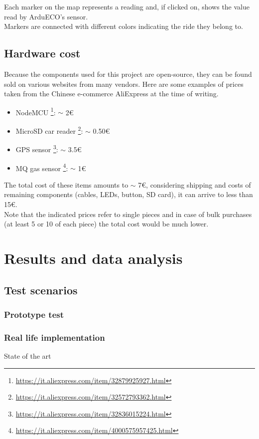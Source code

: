 \documentclass[conference]{IEEEtran}
\begin{document}
		Each marker on the map represents a reading and, if clicked on, shows the value read by ArduECO's sensor.\\
		Markers are connected with different colors indicating the ride they belong to.
		
	\subsection{Hardware cost}
	
		Because the components used for this project are open-source, they can be found sold on various websites from many vendors.
		Here are some examples of prices taken from the Chinese e-commerce AliExpress\cite{aliexpress} at the time of writing.
		\begin{itemize}
			\item NodeMCU \footnote{\url{https://it.aliexpress.com/item/32879925927.html}}: $ \sim $ 2\euro
			\item MicroSD car reader \footnote{\url{https://it.aliexpress.com/item/32572793362.html}}: $ \sim $ 0.50\euro
			\item GPS sensor \footnote{\url{https://it.aliexpress.com/item/32836015224.html}}: $ \sim $ 3.5\euro
			\item MQ gas sensor \footnote{\url{https://it.aliexpress.com/item/4000575957425.html}}: $ \sim $ 1\euro
		\end{itemize}
		The total cost of these items amounts to $\sim$ 7\euro, considering shipping and costs of remaining components (cables, LEDs, button, SD card), it can arrive to less than 15\euro.\\
		Note that the indicated prices refer to single pieces and in case of bulk purchases (at least 5 or 10 of each piece) the total cost would be much lower.
	
\section{Results and data analysis}\label{AA}
	\subsection{Test scenarios}

		\subsubsection{Prototype test}

		\subsubsection{Real life implementation}
			State of the art
	
\end{document}
